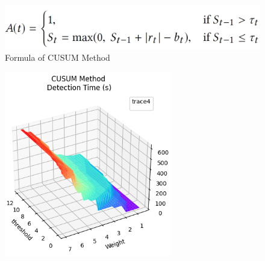 \documentclass[aspectratio=169, 8pt]{beamer}
\begin{document}
\begin{frame}
\begin{columns}[T]
    \begin{column}{0.5\linewidth}
        \begin{figure}
            \centering
            \includegraphics[width = 1.05\textwidth]{images/CUSUM_formula.png}            \caption{Formula of CUSUM Method}
            \label{fig:enter-label}
        \end{figure}
        \begin{figure}
            \centering
            \includegraphics[width = 0.65\textwidth]{images/Garrett_detection_time_CUSUM.png}
            \label{fig:enter-label}
        \end{figure}
    \end{column}
\end{columns}

\end{frame}
\end{document}
